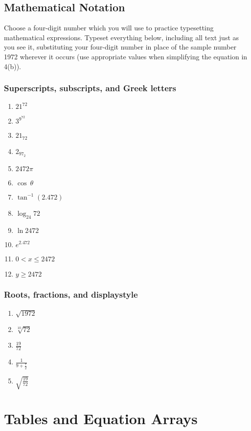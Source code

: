 \documentclass{article}
\begin{document}
\subsection{Mathematical Notation}

Choose a four-digit number which you will use to practice typesetting mathematical expressions. Typeset everything below, including all text just as you see it, substituting your four-digit number in place of the sample number 1972 wherever it occurs (use appropriate values when simplifying the equation in 4(b)).

\subsubsection{Superscripts, subscripts, and Greek letters}

\begin{enumerate}[label=(\alph*)]
\item $21^{72}$
\item $3^{9^{72}}$
\item $21_{72}$
\item $2_{97_{2}}$
\item $2472\pi$
\item $\cos~\theta$
\item $\tan^{-1}(2.472)$
\item $\log_{24}72$
\item $\ln 2472$
\item $e^{2.472}$
\item $0<x\le2472$
\item $y\ge2472$
\end{enumerate}

\subsubsection{Roots, fractions, and displaystyle}

\begin{enumerate}[label=(\alph*)]
\item $\sqrt{1972}$
\item $\sqrt[10]{72}$
\item $\displaystyle \frac{19}{72}$
\item $\displaystyle \frac{1}{9+\frac{7}{2}}$
\item $\displaystyle \sqrt{\frac{19}{72}}$
\end{enumerate}

\section{Tables and Equation Arrays}
\end{document}
